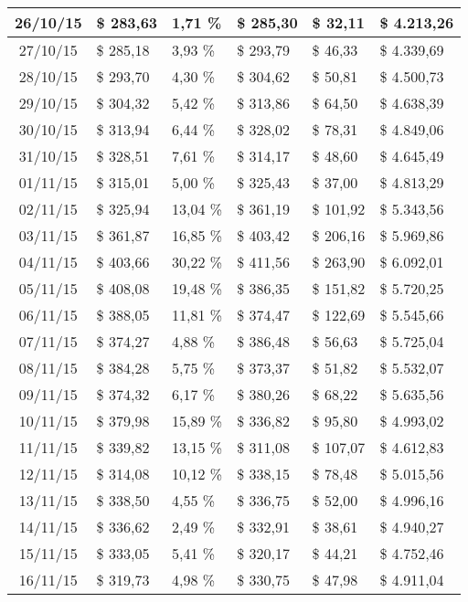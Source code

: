 \begin{small}
\begin{longtable}{|c|l|l|l|l|l|}
26/10/15 & \$ 283,63 & 1,71 \% & \$ 285,30 & \$ 32,11 & \$ 4.213,26 \\ \hline
27/10/15 & \$ 285,18 & 3,93 \% & \$ 293,79 & \$ 46,33 & \$ 4.339,69 \\ \hline
28/10/15 & \$ 293,70 & 4,30 \% & \$ 304,62 & \$ 50,81 & \$ 4.500,73 \\ \hline
29/10/15 & \$ 304,32 & 5,42 \% & \$ 313,86 & \$ 64,50 & \$ 4.638,39 \\ \hline
30/10/15 & \$ 313,94 & 6,44 \% & \$ 328,02 & \$ 78,31 & \$ 4.849,06 \\ \hline
31/10/15 & \$ 328,51 & 7,61 \% & \$ 314,17 & \$ 48,60 & \$ 4.645,49 \\ \hline
01/11/15 & \$ 315,01 & 5,00 \% & \$ 325,43 & \$ 37,00 & \$ 4.813,29 \\ \hline
02/11/15 & \$ 325,94 & 13,04 \% & \$ 361,19 & \$ 101,92 & \$ 5.343,56 \\ \hline
03/11/15 & \$ 361,87 & 16,85 \% & \$ 403,42 & \$ 206,16 & \$ 5.969,86 \\ \hline
04/11/15 & \$ 403,66 & 30,22 \% & \$ 411,56 & \$ 263,90 & \$ 6.092,01 \\ \hline
05/11/15 & \$ 408,08 & 19,48 \% & \$ 386,35 & \$ 151,82 & \$ 5.720,25 \\ \hline
06/11/15 & \$ 388,05 & 11,81 \% & \$ 374,47 & \$ 122,69 & \$ 5.545,66 \\ \hline
07/11/15 & \$ 374,27 & 4,88 \% & \$ 386,48 & \$ 56,63 & \$ 5.725,04 \\ \hline
08/11/15 & \$ 384,28 & 5,75 \% & \$ 373,37 & \$ 51,82 & \$ 5.532,07 \\ \hline
09/11/15 & \$ 374,32 & 6,17 \% & \$ 380,26 & \$ 68,22 & \$ 5.635,56 \\ \hline
10/11/15 & \$ 379,98 & 15,89 \% & \$ 336,82 & \$ 95,80 & \$ 4.993,02 \\ \hline
11/11/15 & \$ 339,82 & 13,15 \% & \$ 311,08 & \$ 107,07 & \$ 4.612,83 \\ \hline
12/11/15 & \$ 314,08 & 10,12 \% & \$ 338,15 & \$ 78,48 & \$ 5.015,56 \\ \hline
13/11/15 & \$ 338,50 & 4,55 \% & \$ 336,75 & \$ 52,00 & \$ 4.996,16 \\ \hline
14/11/15 & \$ 336,62 & 2,49 \% & \$ 332,91 & \$ 38,61 & \$ 4.940,27 \\ \hline
15/11/15 & \$ 333,05 & 5,41 \% & \$ 320,17 & \$ 44,21 & \$ 4.752,46 \\ \hline
16/11/15 & \$ 319,73 & 4,98 \% & \$ 330,75 & \$ 47,98 & \$ 4.911,04 \\ \hline

\end{longtable}
\end{small}
